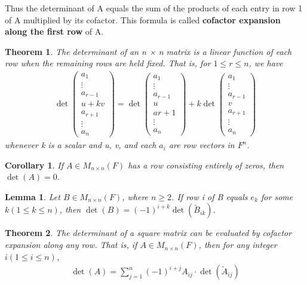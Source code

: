 \documentclass{article}
\newcommand{\bd}[1]{\textbf{#1}}
\newcommand*\bpmat[0]{\begin{pmatrix}}
\newcommand*\epmat[0]{\end{pmatrix}}
\theoremstyle{plain}
\newtheorem{theorem}{Theorem}[section]
\newtheorem*{lemma1}{Lemma}
\newtheorem*{corollary}{Corollary}
\theoremstyle{plain} %
\begin{document}
Thus the determinant of A equals the sum of the products of each entry in row 1 of A multiplied by its cofactor. This formula is called \bd{cofactor expansion along the first row} of A.

\begin{theorem}
  The determinant of an n × n matrix is a linear function of each row when the remaining rows are held fixed. That is, for $1 \leq  r \leq n$, we have
  \begin{align*}
    \det \bpmat a_1\\\vdots\\a_{r-1}\\u+kv\\a_{r+1}\\\vdots\\a_n\epmat =\det \bpmat a_1\\\vdots\\a_{r-1}\\u\\a{r+1}\\\vdots\\a_n\epmat +k\det \bpmat a_1\\\vdots\\a_{r-1}\\v\\a_{r+1}\\\vdots\\a_n\epmat
  \end{align*}
  whenever k is a scalar and u, v, and each $a_i$ are row vectors in $F^n$.
\end{theorem}

\begin{corollary}
  If $A \in M_{n\times n}(F)$ has a row consisting entirely of zeros, then $\det(A)=0$.
\end{corollary}

\begin{lemma1}
  Let $B \in M_{n\times n}(F)$, where $n \geq 2$. If row i of B equals $e_k$ for some $k (1 \leq  k \leq n)$, then $\det(B)=(−1)^{i+k} \det(\tilde{B}_{ik})$.
\end{lemma1}

\begin{theorem}
  The determinant of a square matrix can be evaluated by cofactor expansion along any row. That is, if $A \in M_{n\times n}(F)$, then for any integer $i (1 ≤ i ≤ n)$,
  \begin{align*}
    \det(A) = \sum_{j=1}^n {(-1)}^{i+j}A_{ij}\cdot \det(\tilde{A}_{ij})
  \end{align*}
\end{theorem}
\end{document}
